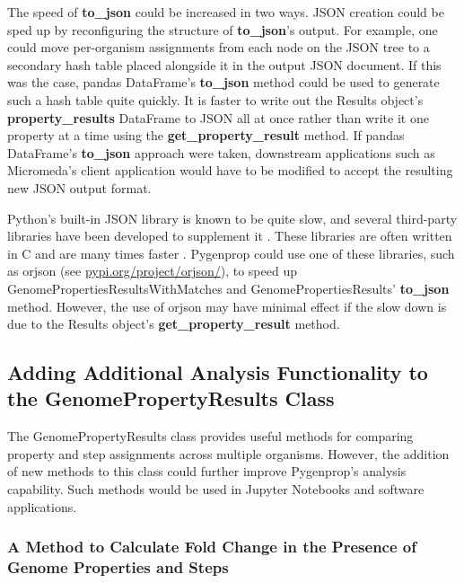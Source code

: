  The speed of \textbf{to\_json} could be increased in two ways. JSON creation could be sped up by reconfiguring the structure of \textbf{to\_json}'s output. For example, one could move per-organism assignments from each node on the JSON tree to a secondary hash table placed alongside it in the output JSON document. If this was the case, pandas DataFrame's \textbf{to\_json} method could be used to generate such a hash table quite quickly. It is faster to write out the Results object's \textbf{property\_results} DataFrame to JSON all at once rather than write it one property at a time using the \textbf{get\_property\_result} method. If pandas DataFrame's \textbf{to\_json} approach were taken, downstream applications such as Micromeda's client application would have to be modified to accept the resulting new JSON output format.

Python's built-in JSON library is known to be quite slow, and several third-party libraries have been developed to supplement it \cite{krylysov_2015}. These libraries are often written in C and are many times faster \cite{krylysov_2015}. Pygenprop could use one of these libraries, such as orjson (see \href{pypi.org/project/orjson/}{pypi.org/project/orjson/}), to speed up GenomePropertiesResultsWithMatches and GenomePropertiesResults' \textbf{to\_json} method. However, the use of orjson may have minimal effect if the slow down is due to the Results object's \textbf{get\_property\_result} method.  

\subsection{Adding Additional Analysis Functionality to the GenomePropertyResults Class}

The GenomePropertyResults class provides useful methods for comparing property and step assignments across multiple organisms. However, the addition of new methods to this class could further improve Pygenprop's analysis capability. Such methods would be used in Jupyter Notebooks and software applications.

\subsubsection{A Method to Calculate Fold Change in the Presence of Genome Properties and Steps}

